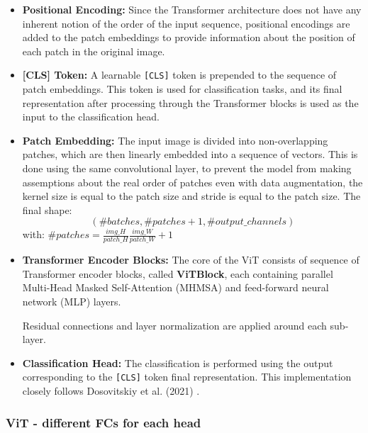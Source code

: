 \documentclass[twocolumn,superscriptaddress,aps]{revtex4-1}
\begin{document}
\begin{itemize}
      \item \textbf{Positional Encoding:} Since the Transformer architecture does not have any inherent notion of the order of the input sequence, positional encodings are added to the patch embeddings to provide information about the position of each patch in the original image.
      \item \textbf{[CLS] Token:} A learnable \texttt{[CLS]} token is prepended to the sequence of patch embeddings. This token is used for classification tasks, and its final representation after processing through the Transformer blocks is used as the input to the classification head.
      \item \textbf{Patch Embedding:} The input image is divided into non-overlapping patches, which are then linearly embedded into a sequence of vectors. This is done using the same convolutional layer, to prevent the model from making assemptions about the real order of patches even with data augmentation, the kernel size is equal to the patch size and stride is equal to the patch size.
      The final shape: $$(\#batches, \#patches + 1, \#output\_channels)$$
      with:
      $\#patches =  \frac{img\_H}{patch\_H} \frac{img\_W}{patch\_W} + 1$
      \item \textbf{Transformer Encoder Blocks:} The core of the ViT consists of sequence of Transformer encoder blocks, called  \textbf{ViTBlock}, each containing parallel Multi-Head Masked Self-Attention (MHMSA) and feed-forward neural network (MLP) layers.
      
      Residual connections and layer normalization are applied around each sub-layer.
      \item \textbf{Classification Head:} The classification is performed using the output corresponding to the \texttt{[CLS]} token final representation. This implementation closely follows Dosovitskiy et al. (2021) \cite{dosovitskiy2020image}.
\end{itemize}



\subsubsection{ViT - different FCs for each head}
\end{document}
